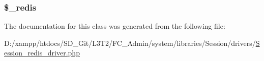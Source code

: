 \subsubsection[{\$\+\_\+redis}]{\setlength{\rightskip}{0pt plus 5cm}\$\+\_\+redis\hspace{0.3cm}{\ttfamily [protected]}}\label{class_c_i___session__redis__driver_a36de60a8fcbe3efac91a87577d0728de}


The documentation for this class was generated from the following file\+:\begin{DoxyCompactItemize}
\item 
D\+:/xampp/htdocs/\+S\+D\+\_\+\+Git/\+L3\+T2/\+F\+C\+\_\+\+Admin/system/libraries/\+Session/drivers/\hyperlink{_session__redis__driver_8php}{Session\+\_\+redis\+\_\+driver.\+php}\end{DoxyCompactItemize}

